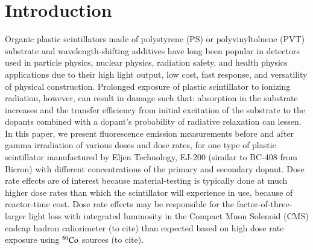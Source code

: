 \documentclass[preprint,12pt]{elsarticle}
\begin{document}

\section{Introduction}
Organic plastic scintillators made of polystyrene (PS) or polyvinyltoluene (PVT) substrate and wavelength-shifting additives have 
long been popular in detectors used in particle physics, nuclear physics, radiation safety, and health physics applications 
due to their high light output, low cost, fast response, and versatility of physical construction. 
Prolonged exposure of plastic scintillator to ionizing radiation, however, can result in damage such that:
absorption in the substrate increases and
the transfer efficiency from initial excitation of the substrate to the dopants
combined with a dopant's probability of radiative relaxation can lessen. 
In this paper, we present fluorescence emission measurements before and after gamma irradiation of various doses and 
dose rates, for one type of plastic scintillator manufactured by Eljen Technology, EJ-200 (similar to BC-408 from Bicron) 
with different concentrations of the primary and secondary dopant.
Dose rate effects are of interest because material-testing is typically done at much higher dose rates than 
which the scintillator will experience in use, because of reactor-time cost.
Dose rate effects may be responsible for the factor-of-three-larger light loss with integrated luminosity 
in the Compact Muon Solenoid (CMS) endcap hadron caliorimeter (to cite) than expected based on high dose rate exposure 
using $\rm {^{60}Co}$ sources (to cite). 














\label{}



\end{document}
